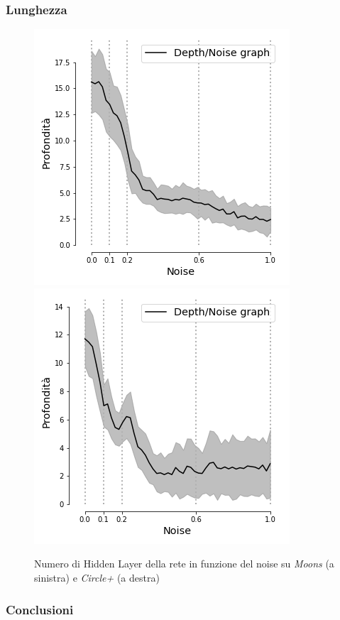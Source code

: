 \documentclass{beamer}
\begin{document}
\begin{frame}
 \frametitle{Lunghezza}
 \begin{figure}
 \includegraphics[scale = 0.4]{images/depth_noise_moons.png}
 \includegraphics[scale = 0.4]{images/depth_noise_circles+.png}
 \caption{Numero di Hidden Layer della rete in funzione del noise su \textit{Moons} (a sinistra) e \textit{Circle+} (a destra)}
 \end{figure}

\end{frame}

\begin{frame}
 \frametitle{Conclusioni}
\end{frame}
\end{document}
